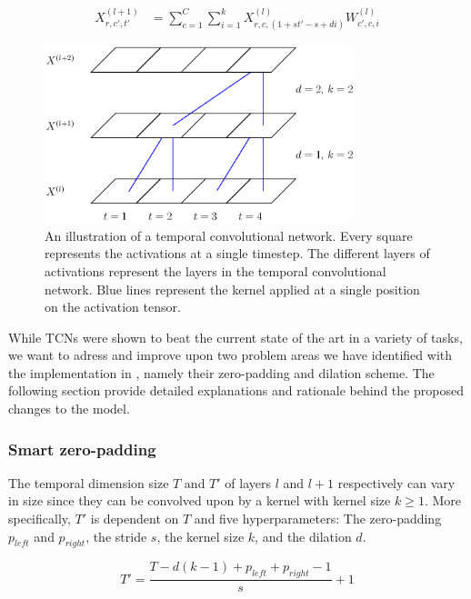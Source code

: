 \documentclass[a4paper, twoside]{article}
\begin{document}
\begin{equation}
\begin{split}
	X^{(l+1)}_{r, c', t'}	
		& = \sum^{C}_{c=1} \sum^{k}_{i=1} X^{(l)}_{r, c, (1 + st'-s+di)}W^{(l)}_{c', c, i}
\end{split}
\end{equation}

\begin{figure}[h]
\begin{center}
    \includegraphics[width=9cm]{figTCNdil.eps}\caption{An illustration of a temporal convolutional network. Every square represents the activations at a single timestep. The different layers of activations represent the layers in the temporal convolutional network. Blue lines represent the kernel applied at a single position on the activation tensor.} 
    
    \label{figTCNdil}
\end{center}
\end{figure}

While TCNs \cite{tcn} were shown to beat the current state of the art in a variety of tasks, we want to adress and improve upon two problem areas we have identified with the implementation in \cite{tcn}, namely their zero-padding and dilation scheme. The following section provide detailed explanations and rationale behind the proposed changes to the model.

\subsubsection{Smart zero-padding}
The temporal dimension size $T$ and $T'$ of layers $l$ and $l+1$ respectively can vary in size since they can be convolved upon by a kernel with kernel size $k \geq 1$. More specifically, $T'$ is dependent on $T$ and five hyperparameters: The zero-padding $p_{left}$ and $p_{right}$, the stride $s$, the kernel size $k$, and the dilation $d$.

\begin{equation}
T' = \frac{T-d(k-1)+p_{left}+p_{right}-1}{s}+1
\end{equation}
\end{document}
